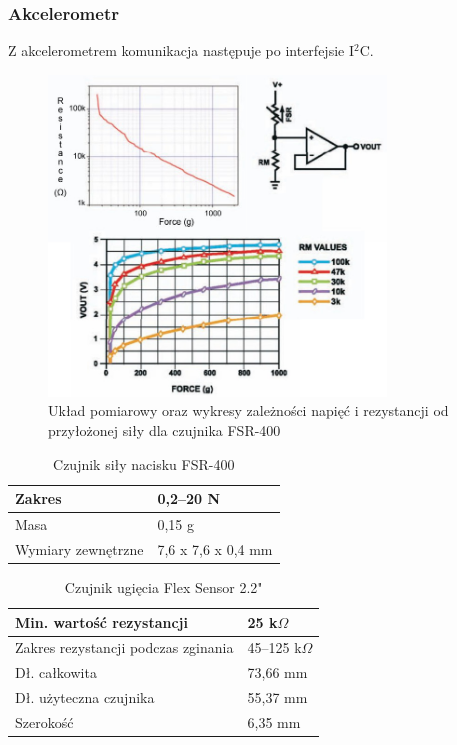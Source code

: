 \documentclass[12pt,a4paper]{article}
\begin{document}
\subsubsection{Akcelerometr}
Z akcelerometrem komunikacja następuje po interfejsie I$^2$C.

\begin{figure}[!htb]
\centering
\includegraphics[width=0.8\textwidth]{images/fsr-400.jpg}
\caption{Układ pomiarowy oraz wykresy zależności napięć i rezystancji od przyłożonej siły dla czujnika FSR-400}
\label{fig:wykresy_fsr-400}
\end{figure}

\begin{table}[!htb]
\centering
\begin{tabularx}
{\textwidth}{ |X|X| }
\hline
Zakres & 0,2--20 N \\
\hline
Masa & 0,15 g \\ 
\hline
Wymiary zewnętrzne & 7,6 x 7,6 x 0,4 mm \\
\hline
\end{tabularx}
\caption{Czujnik siły nacisku FSR-400}
\label{table:tabela_fsr-400}
\end{table}


\begin{table}[!htb]
\centering
\begin{tabularx}
{\textwidth}{ |X|X| }
\hline
Min. wartość rezystancji & 25 k$\Omega$ \\
\hline
Zakres rezystancji podczas zginania & 45--125 k$\Omega$ \\
\hline
Dł. całkowita & 73,66 mm \\
\hline
Dł. użyteczna czujnika & 55,37 mm \\ 
\hline
Szerokość & 6,35 mm \\
\hline
\end{tabularx}
\caption{Czujnik ugięcia Flex Sensor 2.2"}
\label{table:tabela_flexsensor}
\end{table}
\end{document}
